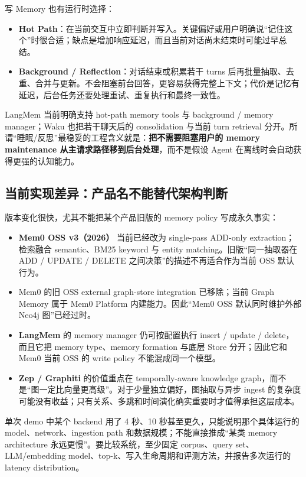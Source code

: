 \documentclass[profile=standard,twoside=false]{ipara-handbook}
\begin{document}
写 Memory 也有运行时选择：

\begin{itemize}
  \item \textbf{Hot Path}：在当前交互中立即判断并写入。关键偏好或用户明确说“记住这个”时很合适；缺点是增加响应延迟，而且当前对话尚未结束时可能过早总结。
  \item \textbf{Background / Reflection}：对话结束或积累若干 turns 后再批量抽取、去重、合并与更新。不会阻塞前台回答，更容易获得完整上下文；代价是记忆有延迟，后台任务还要处理重试、重复执行和最终一致性。
\end{itemize}

LangMem 当前明确支持 hot-path memory tools 与 background  / memory manager；Waku 也把若干聊天后的 consolidation 与当前 turn retrieval 分开。所谓“睡眠/反思”最稳妥的工程含义就是：\textbf{把不需要阻塞用户的 memory maintenance 从主请求路径移到后台处理}，而不是假设 Agent 在离线时会自动获得更强的认知能力。

\subsection{当前实现差异：产品名不能替代架构判断}

版本变化很快，尤其不能把某个产品旧版的 memory policy 写成永久事实：

\begin{itemize}
  \item \textbf{Mem0 OSS v3（2026）} 当前已经改为 single-pass ADD-only extraction；检索融合 semantic、BM25 keyword 与 entity matching。旧版“同一抽取器在 ADD / UPDATE / DELETE 之间决策”的描述不再适合作为当前 OSS 默认行为。
  \item Mem0 的旧 OSS external graph-store integration 已移除；当前 Graph Memory 属于 Mem0 Platform 内建能力。因此“Mem0 OSS 默认同时维护外部 Neo4j 图”已经过时。
  \item \textbf{LangMem} 的 memory manager 仍可按配置执行 insert / update / delete，而且它把 memory type、memory formation 与底层 Store 分开；因此它和 Mem0 当前 OSS 的 write policy 不能混成同一个模型。
  \item \textbf{Zep / Graphiti} 的价值重点在 temporally-aware knowledge graph，而不是“图一定比向量更高级”。对于少量独立偏好，图抽取与异步 ingest 的复杂度可能没有收益；只有关系、多跳和时间演化确实重要时才值得承担这层成本。
\end{itemize}

单次 demo 中某个 backend 用了 4 秒、10 秒甚至更久，只能说明那个具体运行的 model、network、ingestion path 和数据规模；不能直接推成“某类 memory architecture 永远更慢”。要比较系统，至少固定 corpus、query set、LLM/embedding model、top-k、写入生命周期和评测方法，并报告多次运行的 latency distribution。
\end{document}
